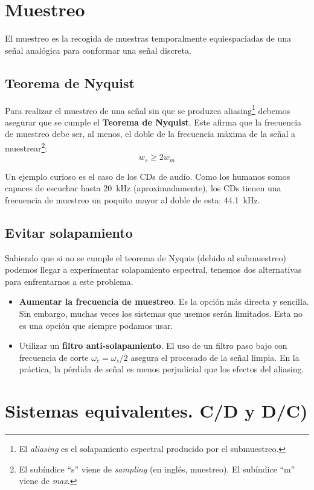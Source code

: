 \documentclass[a4paper]{book}
\begin{document}
\newpage

\section{Muestreo}

El muestreo es la recogida de muestras temporalmente equiespaciadas de una señal analógica para conformar una señal discreta.

\subsection{Teorema de Nyquist}

Para realizar el muestreo de una señal sin que se produzca aliasing\footnote{El \textit{aliasing} es el solapamiento espectral producido por el submuestreo.} debemos asegurar que se cumple el \textbf{Teorema de Nyquist}. Este afirma que la frecuencia de muestreo debe ser, al menos, el doble de la frecuencia máxima de la señal a muestrear\footnote{El subíndice ``s'' viene de \textit{sampling} (en inglés, muestreo). El subíndice ``m'' viene de \textit{max}.}:
\[ w_s \geq 2w_m \]

Un ejemplo curioso es el caso de los CDs de audio. Como los humanos somos capaces de escuchar hasta \SI{20}{\kHz} (aproximadamente), los CDs tienen una frecuencia de muestreo un poquito mayor al doble de esta: \SI{44.1}{\kHz}.

\subsection{Evitar solapamiento}

Sabiendo que si no se cumple el teorema de Nyquis (debido al submuestreo) podemos llegar a experimentar solapamiento espectral, tenemos dos alternativas para enfrentarnos a este problema.
\begin{itemize}
	\item \textbf{Aumentar la frecuencia de muestreo}. Es la opción más directa y sencilla. Sin embargo, muchas veces los sistemas que usemos serán limitados. Esta no es una opción que siempre podamos usar.
	\item Utilizar un \textbf{filtro anti-solapamiento}. El uso de un filtro paso bajo con frecuencia de corte $\omega_c = \omega_s/2$ asegura el procesado de la señal limpia. En la práctica, la pérdida de señal es menos perjudicial que los efectos del aliasing.
\end{itemize}

\section{Sistemas equivalentes. C/D y D/C)}
\end{document}
